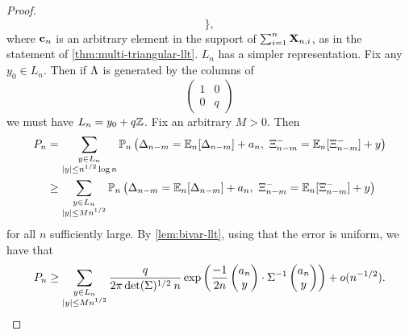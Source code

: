 \begin{proof}
\begin{equation*}
            \Big\},
    \end{equation*}
    where ${\mathbf c}_n$ is an arbitrary element in the support of $\sum_{i=1}^n {\mathbf X}_{n, i}$, as in the statement of \cref{thm:multi-triangular-llt}. 
    $L_n$ has a simpler representation. Fix any $y_0 \in L_n$. Then if $\Lambda$ is generated by the columns of
    \begin{equation*}
        \begin{pmatrix}
            1 & 0 \\
            0 & q
        \end{pmatrix}
    \end{equation*}
    we must have $L_n = y_0 + q{\mathbb Z}$. Fix an arbitrary $M > 0$. Then
    \begin{align*}
        P_n &= \sum_{\substack{y \in L_n \\ \abs{y} \leq n^{1/2} \log n}} \mathbb P_n \left( \Delta_{n-m} = \E_n[\Delta_{n-m}] + a_n, \ \Xi^-_{n-m} = \E_n[\Xi^-_{n-m}] + y \right) \\
        &\geq \sum_{\substack{y \in L_n \\ \abs{y} \leq M n^{1/2}}} \mathbb P_n \left( \Delta_{n-m} = \E_n[\Delta_{n-m}] + a_n, \ \Xi^-_{n-m} = \E_n[\Xi^-_{n-m}] + y \right)
    \end{align*}
    for all $n$ sufficiently large. By \cref{lem:bivar-llt}, using that the error is uniform, we have that
    \begin{equation*}
        P_n \geq \sum_{\substack{y \in L_n \\ \lvert y\rvert \leq M n^{1/2}}} 
         \frac{q}{2\pi \det(\Sigma)^{1/2} \: n} \exp\left( 
            \frac{-1}{2n} \begin{pmatrix} a_n \\ y \end{pmatrix} \cdot \Sigma^{-1} \begin{pmatrix} a_n \\ y \end{pmatrix}
         \right)
         + o( n^{-1/2} ).
    \end{equation*}


\end{proof}
